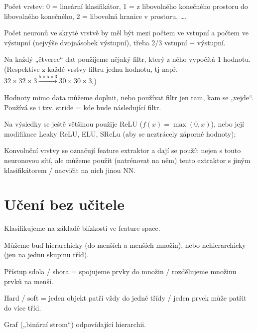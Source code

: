 \documentclass[12pt]{article}					%
\begin{document}
    \begin{poznamka}
        Počet vrstev: 0 = lineární klasifikátor, 1 = z libovolného konečného prostoru do libovolného konečného, 2 = libovolná hranice v prostoru, ….
        
        Počet neuronů ve skryté vrstvě by měl být mezi počtem ve vstupní a počtem ve výstupní (nejvýše dvojnásobek výstupní), třeba 2/3 vstupní + výstupní.
    \end{poznamka}

    \begin{definice}[Konvoluční NN]
        Na každý „čtverec“ dat použijeme nějaký filtr, který z něho vypočítá 1 hodnotu. (Respektive z každé vrstvy filtru jednu hodnotu, tj např. $32 \times 32 \times 3 \overset{5\times 5\times 3}{\rightarrow} 30 \times 30 \times 3$.)

        Hodnoty mimo data můžeme doplnit, nebo používat filtr jen tam, kam se „vejde“. Používá se i tzv. stride = kde bude následující filtr.

        Na výsledky se ještě většinou použije ReLU ($f(x) = \max(0, x)$), nebo její modifikace Leaky ReLU, ELU, SReLu (aby se neztrácely záporné hodnoty);

        Konvoluční vrstvy se označují feature extraktor a dají se použít nejen s touto neuronovou sítí, ale můžeme použít (natrénovat na něm) tento extraktor s jiným klasifikátorem / nacvičit na nich jinou NN.
    \end{definice}

\section{Učení bez učitele}
    \begin{definice}[Clustering]
        Klasifikujeme na základě blízkosti ve feature space.

        Můžeme buď hierarchicky (do menších a menších množin), nebo nehierarchicky (jen na jednu skupinu tříd).

        Přístup sdola / shora = spojujeme prvky do množin / rozdělujeme množinu prvků na menší.

        Hard / soft = jeden objekt patří vždy do jedné třídy / jeden prvek může patřit do více tříd.
    \end{definice}

    \begin{definice}[Dendrogram]
        Graf („binární strom“) odpovídající hierarchii.
    \end{definice}
\end{document}
